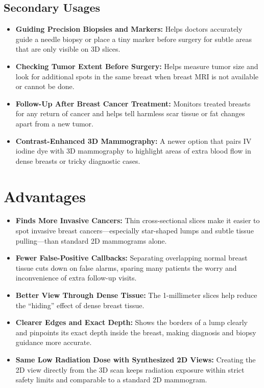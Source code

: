\subsection{Secondary Usages}
\begin{itemize}
\item \textbf{Guiding Precision Biopsies and Markers:} Helps doctors accurately guide a needle biopsy or place a tiny marker before surgery for subtle areas that are only visible on 3D slices.
\item \textbf{Checking Tumor Extent Before Surgery:} Helps measure tumor size and look for additional spots in the same breast when breast MRI is not available or cannot be done.
\item \textbf{Follow-Up After Breast Cancer Treatment:} Monitors treated breasts for any return of cancer and helps tell harmless scar tissue or fat changes apart from a new tumor.
\item \textbf{Contrast-Enhanced 3D Mammography:} A newer option that pairs IV iodine dye with 3D mammography to highlight areas of extra blood flow in dense breasts or tricky diagnostic cases.
\end{itemize}

\section{Advantages}
\begin{itemize}
\item \textbf{Finds More Invasive Cancers:} Thin cross-sectional slices make it easier to spot invasive breast cancers---especially star-shaped lumps and subtle tissue pulling---than standard 2D mammograms alone.
\item \textbf{Fewer False-Positive Callbacks:} Separating overlapping normal breast tissue cuts down on false alarms, sparing many patients the worry and inconvenience of extra follow-up visits.
\item \textbf{Better View Through Dense Tissue:} The 1-millimeter slices help reduce the ``hiding'' effect of dense breast tissue.
\item \textbf{Clearer Edges and Exact Depth:} Shows the borders of a lump clearly and pinpoints its exact depth inside the breast, making diagnosis and biopsy guidance more accurate.
\item \textbf{Same Low Radiation Dose with Synthesized 2D Views:} Creating the 2D view directly from the 3D scan keeps radiation exposure within strict safety limits and comparable to a standard 2D mammogram.
\end{itemize}


